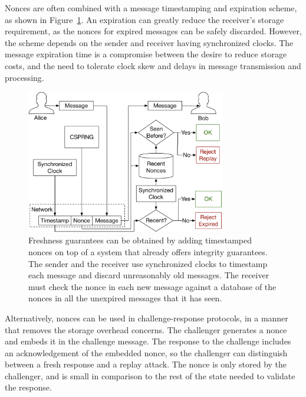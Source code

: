 Nonces are often combined with a message timestamping and expiration scheme, as
shown in Figure~\ref{fig:timestamped_nonces}. An expiration can greatly reduce
the receiver's storage requirement, as the nonces for expired messages can be
safely discarded. However, the scheme depends on the sender and receiver having
synchronized clocks. The message expiration time is a compromise between the
desire to reduce storage costs, and the need to tolerate clock skew and delays
in message transmission and processing.

\begin{figure}[hbt]
  \centering
  \includegraphics[width=87mm]{figures/timestamped_nonces.pdf}
  \caption{
    Freshness guarantees can be obtained by adding timestamped nonces on top
    of a system that already offers integrity guarantees. The sender and the
    receiver use synchronized clocks to timestamp each message and discard
    unreasonably old messages. The receiver must check the nonce in each new
    message against a database of the nonces in all the unexpired messages that
    it has seen.
  }
  \label{fig:timestamped_nonces}
\end{figure}

Alternatively, nonces can be used in challenge-response protocols, in a manner
that removes the storage overhead concerns. The challenger generates a nonce
and embeds it in the challenge message. The response to the challenge includes
an acknowledgement of the embedded nonce, so the challenger can distinguish
between a fresh response and a replay attack. The nonce is only stored by the
challenger, and is small in comparison to the rest of the state needed to
validate the response.

